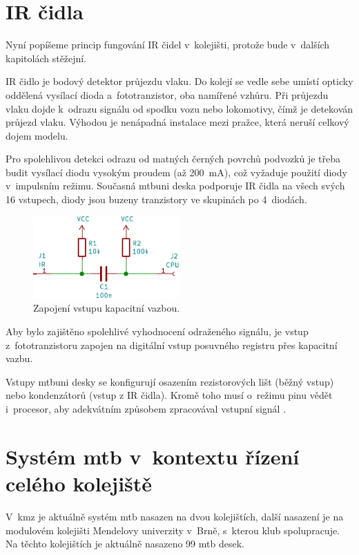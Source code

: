 \section{IR čidla} \label{sec:ir}

Nyní popíšeme princip fungování IR čidel v~kolejišti, protože bude v~dalších
kapitolách stěžejní.

IR čidlo je bodový detektor průjezdu vlaku. Do kolejí se vedle sebe umístí
opticky oddělená vysílací dioda a~fototranzistor, oba namířené vzhůru. Při
průjezdu vlaku dojde k~odrazu signálu od spodku vozu nebo lokomotivy, čímž je
detekován průjezd vlaku. Výhodou je nenápadná instalace mezi pražce, která
neruší celkový dojem modelu.

Pro spolehlivou detekci odrazu od matných černých povrchů podvozků je třeba
budit vysílací diodu vysokým proudem (až 200~mA), což vyžaduje použití
diody v~impulsním režimu. Současná \gls{mtbuni} deska podporuje IR čidla na
všech svých 16 vstupech, diody jsou buzeny tranzistory ve skupinách po
4~diodách.

\begin{figure}[ht]
\includegraphics[width=0.5\textwidth]{data/cap-bind/capacitive-bind-example.pdf}
\caption{Zapojení vstupu kapacitní vazbou.}
\label{fig:cap-bind}
\end{figure}

Aby bylo zajištěno spolehlivé vyhodnocení odraženého signálu, je vstup
z~fototranzistoru zapojen na digitální vstup posuvného registru přes kapacitní
vazbu.

Vstupy \gls{mtbuni} desky se konfigurují osazením rezistorových lišt (běžný
vstup) nebo kondenzátorů (vstup z IR čidla). Kromě toho musí o~režimu pinu
vědět i~procesor, aby adekvátním způsobem zpracovával vstupní signál
\cite{mtbuni22-specs}.


\section{Systém \gls{mtb} v~kontextu řízení celého kolejiště} \label{sec:mtb_context}

V~\gls{kmz} je aktuálně systém \gls{mtb} nasazen na dvou kolejištích, další
nasazení je na modulovém kolejišti Mendelovy univerzity v~Brně, s~kterou klub
spolupracuje. Na těchto kolejištích je aktuálně nasazeno 99 \gls{mtb} desek.

